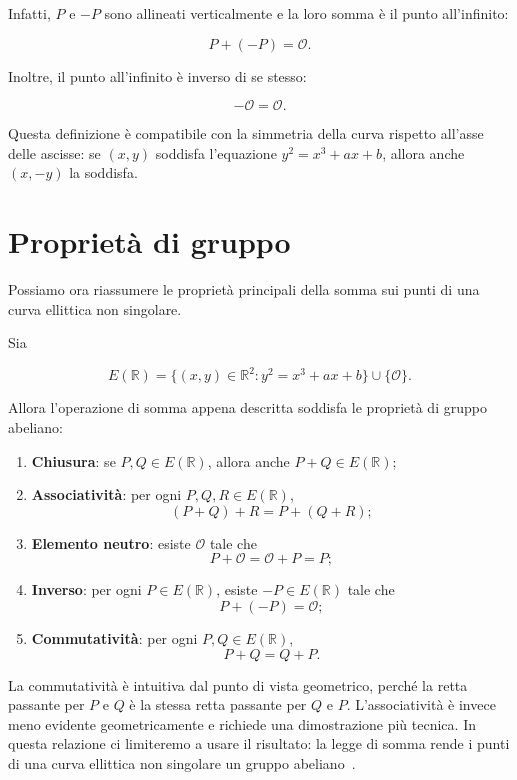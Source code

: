 \documentclass[12pt,a4paper,oneside]{report}
\begin{document}
Infatti, \(P\) e \(-P\) sono allineati verticalmente e la loro somma è il punto all'infinito:

\begin{equation}
    P+(-P)=\mathcal{O}.
\end{equation}

Inoltre, il punto all'infinito è inverso di se stesso:

\begin{equation}
    -\mathcal{O}=\mathcal{O}.
\end{equation}

Questa definizione è compatibile con la simmetria della curva rispetto all'asse delle ascisse: se \((x,y)\) soddisfa l'equazione \(y^2=x^3+ax+b\), allora anche \((x,-y)\) la soddisfa.

\section{Proprietà di gruppo}

Possiamo ora riassumere le proprietà principali della somma sui punti di una curva ellittica non singolare.

Sia

\[
E(\mathbb{R}) = \{(x,y)\in\mathbb{R}^2 : y^2=x^3+ax+b\}\cup\{\mathcal{O}\}.
\]

Allora l'operazione di somma appena descritta soddisfa le proprietà di gruppo abeliano:

\begin{enumerate}
    \item \textbf{Chiusura}: se \(P,Q \in E(\mathbb{R})\), allora anche \(P+Q \in E(\mathbb{R})\);
    \item \textbf{Associatività}: per ogni \(P,Q,R \in E(\mathbb{R})\),
    \[
    (P+Q)+R=P+(Q+R);
    \]
    \item \textbf{Elemento neutro}: esiste \(\mathcal{O}\) tale che
    \[
    P+\mathcal{O}=\mathcal{O}+P=P;
    \]
    \item \textbf{Inverso}: per ogni \(P\in E(\mathbb{R})\), esiste \(-P\in E(\mathbb{R})\) tale che
    \[
    P+(-P)=\mathcal{O};
    \]
    \item \textbf{Commutatività}: per ogni \(P,Q \in E(\mathbb{R})\),
    \[
    P+Q=Q+P.
    \]
\end{enumerate}

La commutatività è intuitiva dal punto di vista geometrico, perché la retta passante per \(P\) e \(Q\) è la stessa retta passante per \(Q\) e \(P\). L'associatività è invece meno evidente geometricamente e richiede una dimostrazione più tecnica. In questa relazione ci limiteremo a usare il risultato: la legge di somma rende i punti di una curva ellittica non singolare un gruppo abeliano~\cite{margara_ec,sec1}.
\end{document}
